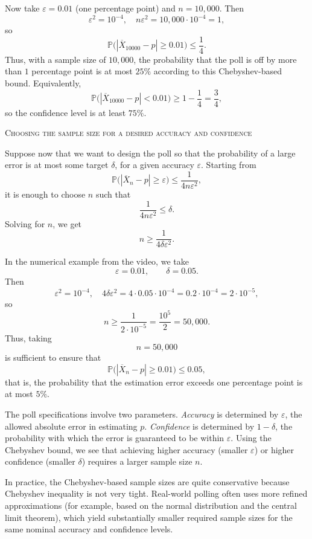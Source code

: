 Now take \(\varepsilon = 0.01\) (one percentage point) and \(n = 10{,}000\).  
Then
\[
\varepsilon^{2} = 10^{-4},
\quad
n \varepsilon^{2} = 10{,}000 \cdot 10^{-4} = 1,
\]
so
\[
\mathbb{P}\big(|\overline{X}_{10000} - p| \ge 0.01\big)
\le
\frac{1}{4}.
\]
Thus, with a sample size of \(10{,}000\), the probability that the poll is off by more than \(1\) percentage point is at most \(25\%\) according to this Chebyshev-based bound.  
Equivalently,
\[
\mathbb{P}\big(|\overline{X}_{10000} - p| < 0.01\big)
\ge
1 - \frac{1}{4}
=
\frac{3}{4},
\]
so the confidence level is at least \(75\%\).  

\bigskip
\textsc{Choosing the sample size for a desired accuracy and confidence}

Suppose now that we want to design the poll so that the probability of a large error is at most some target \(\delta\), for a given accuracy \(\varepsilon\).  
Starting from
\[
\mathbb{P}\big(|\overline{X}_n - p| \ge \varepsilon\big)
\le
\frac{1}{4 n \varepsilon^{2}},
\]
it is enough to choose \(n\) such that
\[
\frac{1}{4 n \varepsilon^{2}} \le \delta.
\]
Solving for \(n\), we get
\[
n
\ge
\frac{1}{4 \delta \varepsilon^{2}}.
\]

In the numerical example from the video, we take
\[
\varepsilon = 0.01,
\qquad
\delta = 0.05.
\]
Then
\[
\varepsilon^{2} = 10^{-4},
\quad
4 \delta \varepsilon^{2}
=
4 \cdot 0.05 \cdot 10^{-4}
=
0.2 \cdot 10^{-4}
=
2 \cdot 10^{-5},
\]
so
\[
n
\ge
\frac{1}{2 \cdot 10^{-5}}
=
\frac{10^{5}}{2}
=
50{,}000.
\]
Thus, taking
\[
n = 50{,}000
\]
is sufficient to ensure that
\[
\mathbb{P}\big(|\overline{X}_n - p| \ge 0.01\big)
\le
0.05,
\]
that is, the probability that the estimation error exceeds one percentage point is at most \(5\%\).  

The poll specifications involve two parameters.  
\textit{Accuracy} is determined by \(\varepsilon\), the allowed absolute error in estimating \(p\).  
\textit{Confidence} is determined by \(1 - \delta\), the probability with which the error is guaranteed to be within \(\varepsilon\).  
Using the Chebyshev bound, we see that achieving higher accuracy (smaller \(\varepsilon\)) or higher confidence (smaller \(\delta\)) requires a larger sample size \(n\).  

In practice, the Chebyshev-based sample sizes are quite conservative because Chebyshev inequality is not very tight.  
Real-world polling often uses more refined approximations (for example, based on the normal distribution and the central limit theorem), which yield substantially smaller required sample sizes for the same nominal accuracy and confidence levels.

